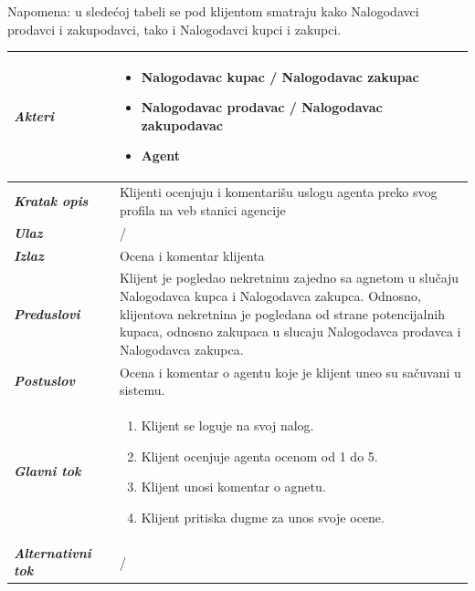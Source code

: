\documentclass[20pt]{article}
\begin{document}
Napomena: u slede\' coj tabeli se pod klijentom smatraju kako Nalogodavci prodavci i zakupodavci, tako i Nalogodavci kupci i zakupci.
\begin{center}
\begin{longtable}{p{0.23\linewidth} p{0.77\linewidth}}
 \hline
 {\it \bfseries Akteri} & \begin{itemize}
    \item Nalogodavac kupac / Nalogodavac zakupac
    \item Nalogodavac prodavac / Nalogodavac zakupodavac
    \item Agent
\end{itemize}\\
\hline

 {\it \bfseries Kratak opis} & Klijenti ocenjuju i komentari\v{s}u uslogu agenta preko svog profila na veb stanici agencije\\ 
 \hline
 
 {\it \bfseries Ulaz} & /\\ 
 \hline
 
 {\it \bfseries Izlaz} & Ocena i komentar klijenta\\
 \hline
 
 {\it \bfseries Preduslovi} & Klijent je pogledao nekretninu zajedno sa agnetom u slu\v caju Nalogodavca kupca i Nalogodavca zakupca. Odnosno, klijentova nekretnina je pogledana od strane potencijalnih kupaca, odnosno zakupaca u slucaju Nalogodavca prodavca i Nalogodavca zakupca.\\
 \hline

 {\it \bfseries Postuslov} & Ocena i komentar o agentu koje je klijent uneo su sa\v cuvani u sistemu.\\
 \hline

     {\it \bfseries Glavni tok} &  
     \begin{enumerate}
         \item  Klijent se loguje na svoj nalog.
         \item  Klijent ocenjuje agenta ocenom od 1 do 5.
         \item  Klijent unosi komentar o agnetu.
         \item  Klijent pritiska dugme za unos svoje ocene.
    \end{enumerate}\\
 \hline

 {\it \bfseries Alternativni tok} & /\\
 \hline
\end{longtable}
\end{center}
\end{document}
